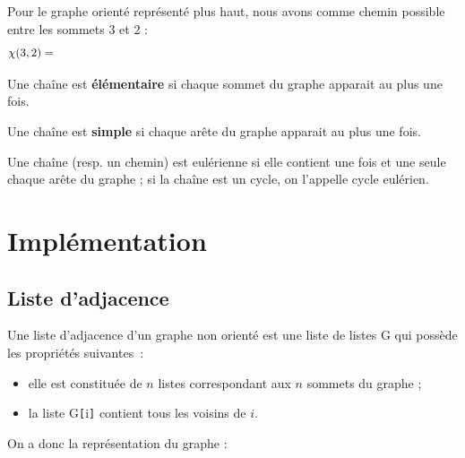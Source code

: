 Pour le graphe orienté représenté plus haut, nous avons comme chemin possible entre les sommets $3$ et $2$ :
$$\chi(3,2)= \Cache{{3,0,1,2}}$$

%


Une chaîne est \textbf{élémentaire} si chaque sommet du graphe apparait au plus une fois.

\smallskip
Une chaîne est \textbf{simple} si chaque arête du graphe apparait au plus une fois.


\begin{defi}
Une chaîne (resp. un chemin) est eulérienne si elle contient une fois et une seule chaque arête du graphe ; si la chaîne est un cycle, on l'appelle cycle eulérien.
\end{defi}


\section{Implémentation}

\subsection{Liste d'adjacence}

Une liste d'adjacence d'un graphe non orienté est une liste de listes G qui possède les propriétés suivantes~: 
\begin{itemize}
	\item elle est constituée de $n$ listes correspondant aux $n$ sommets du graphe ;
	\item la liste G\verb![!i\verb!]! contient tous les voisins de $i$. 
\end{itemize}

On a donc la représentation du graphe :

\begin{center}
\end{center}

